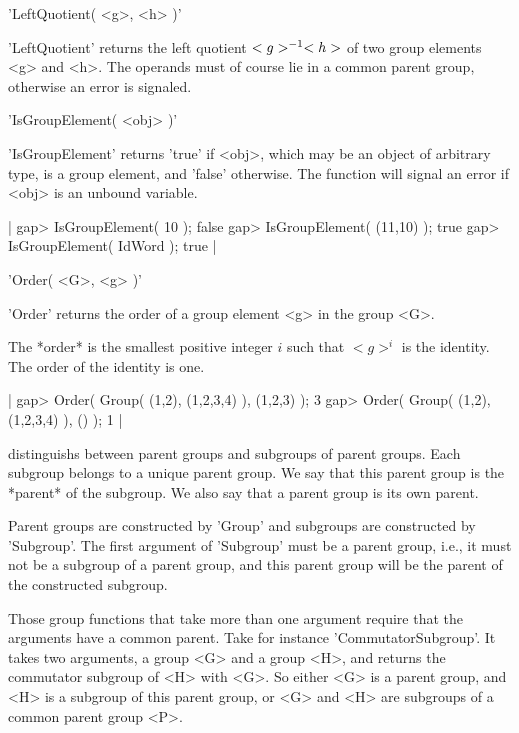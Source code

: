 \vspace{5mm}
'LeftQuotient( <g>, <h> )'%

'LeftQuotient'  returns the  left quotient $<g>^{-1}\*  <h>$ of two group
elements <g> and <h>.  The operands must of course lie in a common parent
group, otherwise an error is signaled.

%

'IsGroupElement( <obj> )'

'IsGroupElement'  returns  'true' if  <obj>,  which may  be  an object of
arbitrary type, is a  group element, and  'false' otherwise. The function
will signal an error if <obj> is an unbound variable.

|    gap> IsGroupElement( 10 );
    false
    gap> IsGroupElement( (11,10) );
    true
    gap> IsGroupElement( IdWord );
    true |

%

'Order( <G>, <g> )'

'Order' returns the order of a group element <g> in the group <G>.

The *order* is the smallest positive integer $i$ such that $<g>^i$ is the
identity.  The order of the identity is one.

|    gap> Order( Group( (1,2), (1,2,3,4) ), (1,2,3) );
    3
    gap> Order( Group( (1,2), (1,2,3,4) ), () );
    1 |



{\GAP} distinguishs between parent groups and subgroups of parent groups.
Each subgroup belongs to  a unique parent group.  We say that this parent
group is the *parent* of the  subgroup.  We also say that a  parent group
is its own parent.

Parent groups are constructed by 'Group' and subgroups are constructed by
'Subgroup'.  The first argument of  'Subgroup'  must be  a parent  group,
i.e., it must not be a subgroup of a  parent group, and this parent group
will be the parent of the constructed subgroup.

Those group functions that take more than one  argument require that  the
arguments have a common parent. Take for instance 'CommutatorSubgroup'. It
takes two  arguments,  a  group <G>  and  a  group  <H>, and  returns the
commutator subgroup  of <H> with <G>.  So either <G> is a parent group,
and <H> is a
subgroup of this parent  group, or <G> and <H> are  subgroups of a common
parent group <P>.

